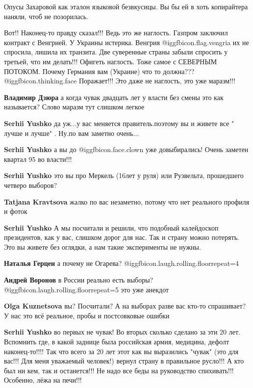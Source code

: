 \begin{itemize}
Опусы Захаровой как эталон языковой безвкусицы. Вы бы ей в хоть копирайтера наняли, чтоб не позорилась.


Вот!! Наконец-то правду сказал!!! Ведь это же наглость. Газпром заключил
контракт с Венгрией. У Украины истерика. Венгрия @igg{fbicon.flag.vengria} их не спросила, лишила их
транзита. Две суверенные страны забыли спросить у третьей, что им делать!!!
Офигеть наглость. Тоже самое с СЕВЕРНЫМ ПОТОКОМ. Почему Германия вам (Украине)
что то должна???  @igg{fbicon.thinking.face}  Поражает!!! Это даже не наглость, это уже маразм!!!

\begin{itemize} %
\textbf{Владимир Дзюра} а когда чувак двадцать лет у власти без смены это как называется? Слово маразм тут слишком легкое

\textbf{Serhii Yushko} да уж...у вас меняется правитель.поэтому вы и живете все " лучше и лучше" . Ну.по вам заметно очень...

\textbf{Serhii Yushko} а вы до  @igg{fbicon.face.clown}  уже довыбирались! Очень заметен квартал 95 во власти!!!

\textbf{Serhii Yushko} это вы про Меркель (16лет у руля) или Рузвельта, прошедшего четверо выборов?

\textbf{Tatjana Kravtsova} жалко по вас незаметно, потому что нет реального профиля и фоток

\textbf{Serhii Yushko} А мы посчитали и решили, что подобный калейдоскоп президентов, как у вас, слишком дорог для нас. Так и страну можно потерять. Это вы живете без оглядки, а нам такие эксперименты не нужны.

\textbf{Наталья Герцен} а почему не Огарева?  @igg{fbicon.laugh.rolling.floor}{repeat=4} 

\textbf{Андрей Воронов} в России реально есть выборы?  @igg{fbicon.laugh.rolling.floor}{repeat=5}  это уже анекдот

\textbf{Olga Kuznetsova} вы? Посчитали? А на выборах разве вас кто-то спрашивает? У нас это всё реальное, пробы и постсовковые ошибки

\textbf{Serhii Yushko} во первых не чувак! Во вторых сколько сделано за эти 20 лет. Вспомнить где, в какой заднице была российская армия, медицина, дефолт наконец-то!!!! Так что всего за 20 лет этот как вы выразились "чувак" (это для вас!!! Для меня уважаемый человек!) вернул страну в правильное русло!!! А кто был ни кем, так и останется!!! Не надо все беды на руководство спихивать!!! Особенно, лёжа на печи!!!


\end{itemize}
\end{itemize}
